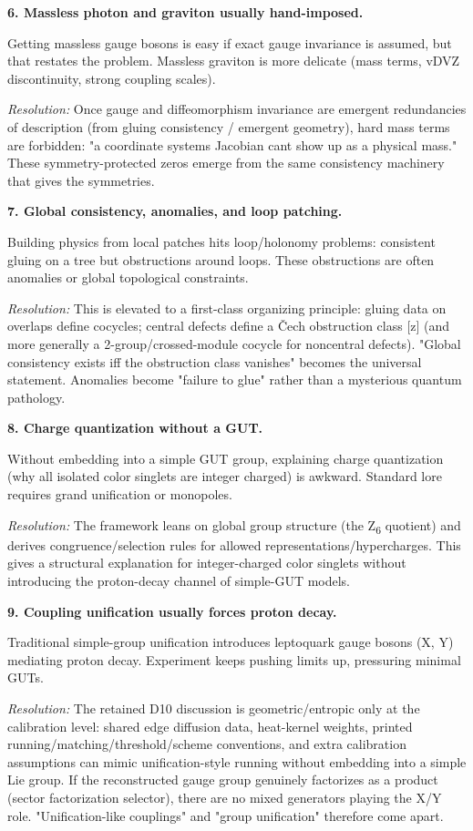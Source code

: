 \textbf{6. Massless photon and graviton usually hand-imposed.}

Getting massless gauge bosons is easy if exact gauge invariance is assumed, but that restates the problem. Massless graviton is more delicate (mass terms, vDVZ discontinuity, strong coupling scales).

\emph{Resolution:} Once gauge and diffeomorphism invariance are emergent redundancies of description (from gluing consistency / emergent geometry), hard mass terms are forbidden: "a coordinate system\textquotesingle s Jacobian can\textquotesingle t show up as a physical mass." These symmetry-protected zeros emerge from the same consistency machinery that gives the symmetries.

\textbf{7. Global consistency, anomalies, and loop patching.}

Building physics from local patches hits loop/holonomy problems: consistent gluing on a tree but obstructions around loops. These obstructions are often anomalies or global topological constraints.

\emph{Resolution:} This is elevated to a first-class organizing principle: gluing data on overlaps define cocycles; central defects define a \v{C}ech obstruction class {[}z{]} (and more generally a 2-group/crossed-module cocycle for noncentral defects). "Global consistency exists iff the obstruction class vanishes" becomes the universal statement. Anomalies become "failure to glue" rather than a mysterious quantum pathology.

\textbf{8. Charge quantization without a GUT.}

Without embedding into a simple GUT group, explaining charge quantization (why all isolated color singlets are integer charged) is awkward. Standard lore requires grand unification or monopoles.

\emph{Resolution:} The framework leans on global group structure (the Z\textsubscript{6} quotient) and derives congruence/selection rules for allowed representations/hypercharges. This gives a structural explanation for integer-charged color singlets without introducing the proton-decay channel of simple-GUT models.

\textbf{9. Coupling unification usually forces proton decay.}

Traditional simple-group unification introduces leptoquark gauge bosons (X, Y) mediating proton decay. Experiment keeps pushing limits up, pressuring minimal GUTs.

\emph{Resolution:} The retained D10 discussion is geometric/entropic only at the calibration level: shared edge diffusion data, heat-kernel weights, printed running/matching/threshold/scheme conventions, and extra calibration assumptions can mimic unification-style running without embedding into a simple Lie group. If the reconstructed gauge group genuinely factorizes as a product (sector factorization selector), there are no mixed generators playing the X/Y role. "Unification-like couplings" and "group unification" therefore come apart.

